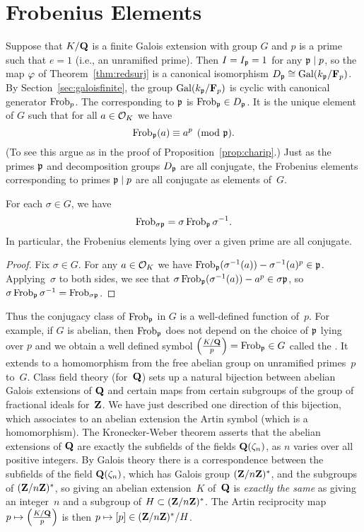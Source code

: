 \section{Frobenius Elements}
Suppose that $K/\mathbf{Q}$ is a finite Galois extension with group $G$ and
$p$ is a prime such that $e=1$ (i.e., an unramified prime).  Then 
$I=I_{\mathfrak{p}}=1$ for any $\mathfrak{p}\mid p$, so the map $\varphi$ of 
Theorem~\ref{thm:redsurj}
is a canonical isomorphism $D_{\mathfrak{p}} \cong \operatorname{Gal}( k_{\mathfrak{p}}/\mathbf{F}_p)$.  
By Section~\ref{sec:galoisfinite},
the group $\operatorname{Gal}( k_{\mathfrak{p}}/\mathbf{F}_p)$ is
cyclic with canonical generator $\operatorname{Frob}_p$.  
The  corresponding to $\mathfrak{p}$ is
$\operatorname{Frob}_{\mathfrak{p}}\in D_{\mathfrak{p}}$. It is the unique element of $G$ such that for all
$a\in\mathcal{O}_K$ we have 
$$
  \operatorname{Frob}_{\mathfrak{p}}(a)\equiv a^p\pmod{\mathfrak{p}}.
$$
(To see this argue as in the proof of Proposition~\ref{prop:charip}.)
Just as the primes $\mathfrak{p}$ and decomposition groups $D_{\mathfrak{p}}$ are all
conjugate, the Frobenius elements corresponding to primes
$\mathfrak{p}\mid p$ are all conjugate as elements of~$G$.
\begin{proposition}
For each $\sigma \in G$, we have 
$$
 \operatorname{Frob}_{\sigma\mathfrak{p}} = \sigma\operatorname{Frob}_{\mathfrak{p}}\sigma^{-1}.
$$
In particular, the Frobenius elements lying over a given
prime are all conjugate.
\end{proposition}
\begin{proof}
Fix $\sigma\in G$. For any $a\in\mathcal{O}_K$ we have
$\operatorname{Frob}_{\mathfrak{p}}(\sigma^{-1}(a)) - \sigma^{-1}(a)^p \in \mathfrak{p}$. 
Applying~$\sigma$ to both sides, we see that 
$\sigma\operatorname{Frob}_{\mathfrak{p}}(\sigma^{-1}(a)) - a^p \in \sigma\mathfrak{p}$,
so $\sigma\operatorname{Frob}_{\mathfrak{p}}\sigma^{-1} = \operatorname{Frob}_{\sigma \mathfrak{p}}$.
\end{proof}

Thus the conjugacy class of $\operatorname{Frob}_{\mathfrak{p}}$ in $G$ is a well-defined
function of~$p$.  For example, if $G$ is abelian, then $\operatorname{Frob}_{\mathfrak{p}}$ does
not depend on the choice of $\mathfrak{p}$ lying over $p$ and we obtain a well
defined symbol $\left(\frac{K/\mathbf{Q}}{p}\right) =\operatorname{Frob}_{\mathfrak{p}}\in G$ called the .  It extends to a homomorphism from the free abelian
group on unramified primes~$p$ to~$G$.  
Class field theory (for~$\mathbf{Q}$) sets up a natural bijection
between abelian Galois extensions of $\mathbf{Q}$ and certain maps from
certain subgroups of the group of fractional ideals for~$\mathbf{Z}$.  We have
just described one direction of this bijection, which associates to an
abelian extension the Artin symbol (which is a homomorphism).
The Kronecker-Weber theorem asserts that the abelian extensions of
$\mathbf{Q}$ are exactly the subfields of the fields $\mathbf{Q}(\zeta_n)$, as $n$
varies over all positive integers.  By Galois theory there is a
correspondence between the subfields of the field $\mathbf{Q}(\zeta_n)$, 
which has
Galois group $(\mathbf{Z}/n\mathbf{Z})^*$, and the subgroups of $(\mathbf{Z}/n\mathbf{Z})^*$, so giving
an abelian extension~$K$ of~$\mathbf{Q}$ is {\em exactly the same} as giving an
integer~$n$ and a subgroup of $H\subset (\mathbf{Z}/n\mathbf{Z})^*$. The
Artin reciprocity map $p\mapsto \left(\frac{K/\mathbf{Q}}{p}\right)$ is then $p\mapsto
[p]\in (\mathbf{Z}/n\mathbf{Z})^*/H$.    

